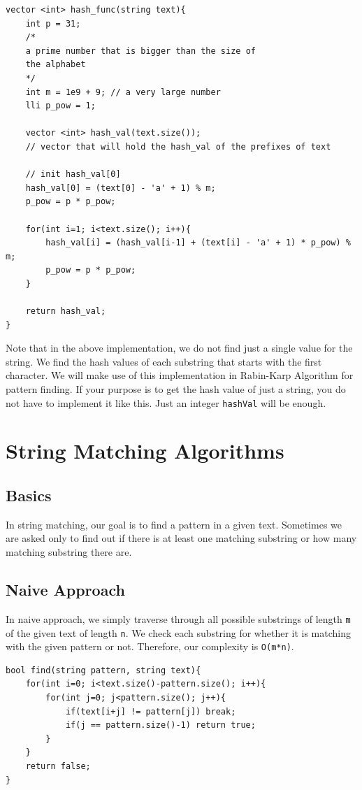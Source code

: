 \documentclass[12pt]{article}
\begin{document}
    	\begin{verbatim}
vector <int> hash_func(string text){
	int p = 31; 
	/*
	a prime number that is bigger than the size of 
	the alphabet
	*/
	int m = 1e9 + 9; // a very large number
	lli p_pow = 1;

	vector <int> hash_val(text.size());
	// vector that will hold the hash_val of the prefixes of text

	// init hash_val[0]
	hash_val[0] = (text[0] - 'a' + 1) % m;
	p_pow = p * p_pow;

	for(int i=1; i<text.size(); i++){
		hash_val[i] = (hash_val[i-1] + (text[i] - 'a' + 1) * p_pow)	% m;
		p_pow = p * p_pow;
	}

	return hash_val;
}
        \end{verbatim}
    	
    	Note that in the above implementation, we do not find just a single value for the string. We find the hash values of each substring that starts with the first character. We will make use of this implementation in Rabin-Karp Algorithm for pattern finding. If your purpose is to get the hash value of just a string, you do not have to implement it like this. Just an integer \texttt{hashVal} will be enough.
    	
    	\section{String Matching Algorithms}
    	
    	\subsection{Basics}
    	
        In string matching, our goal is to find a pattern in a given text. Sometimes we are asked only to find out if there is at least one matching substring or how many matching substring there are.
    	
    	\subsection{Naive Approach}
    	In naive approach, we simply traverse through all possible substrings of length \texttt{m} of the given text of length \texttt{n}. We check each substring for whether it is matching with the given pattern or not. Therefore, our complexity is \texttt{O(m*n)}.
    	
    	\begin{verbatim}
bool find(string pattern, string text){
    for(int i=0; i<text.size()-pattern.size(); i++){
        for(int j=0; j<pattern.size(); j++){
            if(text[i+j] != pattern[j]) break;
            if(j == pattern.size()-1) return true;
        }
    }
    return false;
}
        \end{verbatim}
        
\end{document}
